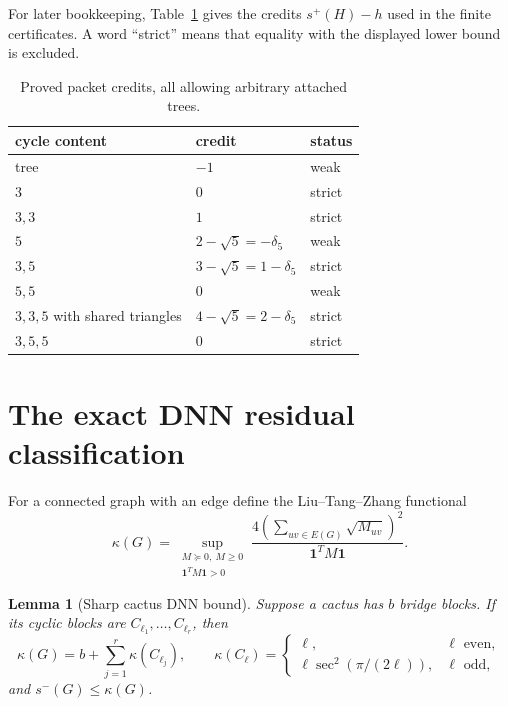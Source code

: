 \documentclass[11pt]{article}
\newtheorem{lemma}[theorem]{Lemma}
\theoremstyle{remark}
\newcommand{\one}{\mathbf 1}
\begin{document}
For later bookkeeping, Table~\ref{tab:credits} gives the credits
$s^+(H)-h$ used in the finite certificates.  A word ``strict'' means that
equality with the displayed lower bound is excluded.
\begin{table}[ht]
\centering\small
\begin{tabular}{lll}
cycle content & credit & status\\\hline
tree &$-1$& weak\\
$3$ &$0$& strict\\
$3,3$ &$1$& strict\\
$5$ &$2-\sqrt5=-\delta_5$& weak\\
$3,5$ &$3-\sqrt5=1-\delta_5$& strict\\
$5,5$ &$0$& weak\\
$3,3,5$ with shared triangles &$4-\sqrt5=2-\delta_5$& strict\\
$3,5,5$ &$0$& strict
\end{tabular}
\caption{Proved packet credits, all allowing arbitrary attached trees.}
\label{tab:credits}
\end{table}

\section{The exact DNN residual classification}

For a connected graph with an edge define the Liu--Tang--Zhang functional
\[
 \kappa(G)=\sup_{\substack{M\succeq0,\ M\geq0\\\one^TM\one>0}}
 \frac{4(\sum_{uv\in E(G)}\sqrt{M_{uv}})^2}{\one^TM\one}.
\]

\begin{lemma}[Sharp cactus DNN bound]\label{lem:dnn}
Suppose a cactus has $b$ bridge blocks.  If its cyclic blocks are
$C_{\ell_1},\ldots,C_{\ell_r}$, then
\[
 \kappa(G)=b+\sum_{j=1}^r\kappa(C_{\ell_j}),\qquad
 \kappa(C_\ell)=\begin{cases}
 \ell,&\ell\text{ even},\\
 \ell\sec^2(\pi/(2\ell)),&\ell\text{ odd},
 \end{cases}
\]
and $s^-(G)\leq\kappa(G)$.
\end{lemma}
\end{document}
